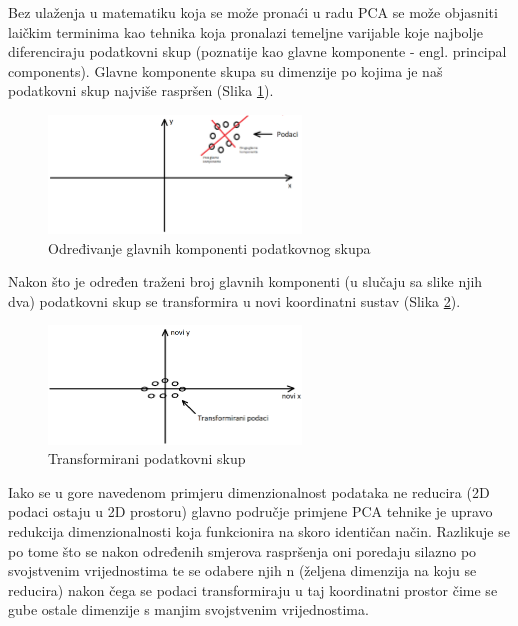 \documentclass[times, utf8, proizvoljni, numeric]{fer}
\begin{document}
Bez ulaženja u matematiku koja se može pronaći u radu \cite{PCA} PCA se može objasniti laičkim terminima kao tehnika koja pronalazi temeljne varijable koje najbolje diferenciraju podatkovni skup (poznatije kao glavne komponente - engl. principal components). Glavne komponente skupa su dimenzije po kojima je naš podatkovni skup najviše raspršen (Slika \ref{fg:pca_start}).

\begin{figure}[!ht]
	\begin{center}
		\captionsetup{justification=centering}
		\includegraphics[width=0.6\textwidth]{./imgs/pca_start.png}
		\caption{Određivanje glavnih komponenti podatkovnog skupa}
		\label{fg:pca_start}
	\end{center}
\end{figure}

Nakon što je određen traženi broj glavnih komponenti (u slučaju sa slike njih dva) podatkovni skup se transformira u novi koordinatni sustav (Slika \ref{fg:pca_end}).

\begin{figure}[!ht]
	\begin{center}
		\captionsetup{justification=centering}
		\includegraphics[width=0.6\textwidth]{./imgs/pca_end.png}
		\caption{Transformirani podatkovni skup}
		\label{fg:pca_end}
	\end{center}
\end{figure}

Iako se u gore navedenom primjeru dimenzionalnost podataka ne reducira (2D podaci ostaju u 2D prostoru) glavno područje primjene PCA tehnike je upravo redukcija dimenzionalnosti koja funkcionira na skoro identičan način. Razlikuje se po tome što se nakon određenih smjerova raspršenja oni poredaju silazno po svojstvenim vrijednostima te se odabere njih n (željena dimenzija na koju se reducira) nakon čega se podaci transformiraju u taj koordinatni prostor čime se gube ostale dimenzije s manjim svojstvenim vrijednostima. 
\end{document}
